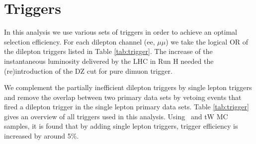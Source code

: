 
\section{Triggers}
\label{tW_Trigger}

In this analysis we use various sets of triggers in order to achieve an optimal selection efficiency.
For each dilepton channel (ee, $\mu\mu$) we take the logical OR of the dilepton triggers listed
in Table \ref{tab:trigger}.
The increase of the instantaneous luminosity delivered by the LHC in Run H needed the (re)introduction of the DZ cut for pure dimuon trigger.

We complement the partially inefficient dilepton triggers by single lepton triggers and remove the overlap between two
primary data sets by vetoing events that fired a dilepton trigger in the single lepton primary
data sets.
Table \ref{tab:trigger} gives an overview of all triggers used in this analysis.
Using \ttbar ~and tW MC samples, it is found that by adding single lepton triggers, trigger efficiency is increased by around 5\%.


